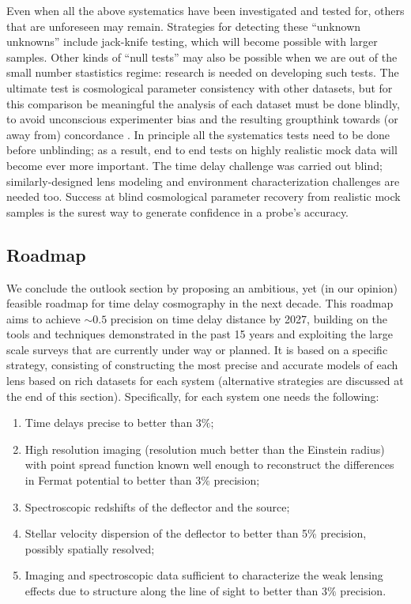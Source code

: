 Even when all the above systematics have been investigated and tested
for, others that are unforeseen may remain. Strategies for detecting
these ``unknown unknowns'' include jack-knife testing, which  will
become possible with larger samples. Other kinds of ``null tests'' may
also be possible when we are out of the small number stastistics regime:
research is needed on developing such tests. The ultimate test is
cosmological parameter consistency with other datasets, but for this
comparison be meaningful the analysis of each dataset must be done
blindly, to avoid unconscious experimenter bias and the resulting
groupthink towards (or away from) concordance
\citep[see e.g.][]{ConleyEtal2006,SuyuEtal2013}. In principle all the
systematics tests  need to be done before unblinding; as a result, end
to end tests on highly realistic mock data will become ever more
important. The time delay challenge was carried out blind;
similarly-designed lens modeling and environment characterization
challenges are needed too. Success at blind cosmological parameter
recovery from realistic mock samples is the surest way to generate
confidence in a probe's accuracy.



\subsection{Roadmap}
\label{ssec:roadmap}

We conclude the outlook section by proposing an ambitious, yet (in our
opinion) feasible roadmap for time delay cosmography in the next
decade. This roadmap aims to achieve $\sim0.5$ precision on time delay
distance by 2027, building on the tools and techniques demonstrated in
the past 15 years and exploiting the large scale surveys that are
currently under way or planned. It is based on a specific strategy,
consisting of constructing the most precise and accurate models of
each lens based on rich datasets for each system (alternative
strategies are discussed at the end of this section). Specifically,
for each system one needs the following:

\begin{enumerate}
\item Time delays precise to better than $3\%$;
\item High resolution imaging (resolution much better than the Einstein
radius) with point spread function known well enough to reconstruct the
differences in Fermat potential to better than $3\%$ precision;
\item Spectroscopic redshifts of the deflector and the source;
\item Stellar velocity dispersion of the deflector to better than 5\%
precision, possibly spatially resolved;
\item Imaging and spectroscopic data sufficient to characterize the
weak lensing effects due to structure along the line of sight to better than
$3\%$ precision.
\end{enumerate}

